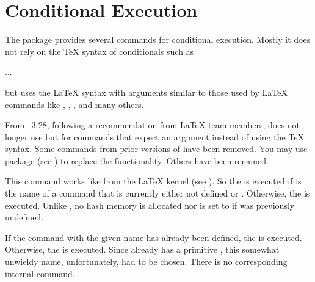 %
\EndIndexGroup


\section{Conditional Execution}

The  package provides several commands for conditional
execution. Mostly it does not rely on the \TeX{} syntax of conditionals such
as
\begin{lstcode}
  \iftrue
    ...
  \else
    ...
  \fi
\end{lstcode}
but uses the \LaTeX{} syntax with arguments similar to those used by \LaTeX{}
commands like , ,
, and many others.

From \KOMAScript~3.28, following a recommendation from \LaTeX{} team members,
 does not longer use  but  for
commands that expect an argument instead of using the \TeX{}
syntax. Some commands from prior versions of \KOMAScript{} have been
removed. You may use package  (see \cite{package:iftex}) to
replace the functionality. Others have been renamed.

\begin{Declaration}
\end{Declaration}
This command works like
 from the \LaTeX{} kernel (see \cite{latex:source2e}). So
the  is executed if  is the name of a
command that is currently either not defined or . Otherwise, the
 is executed. Unlike , no hash
memory is allocated nor is  set to  if
 was previously undefined.%
\EndIndexGroup

\begin{Declaration}
\end{Declaration}
If the command with the given name has
already been defined, the  is executed. Otherwise, the
 is executed.  Since \eTeX{} already has a primitive
, this somewhat unwieldy name, unfortunately, had to be
chosen. There is no corresponding internal command.%
\EndIndexGroup


